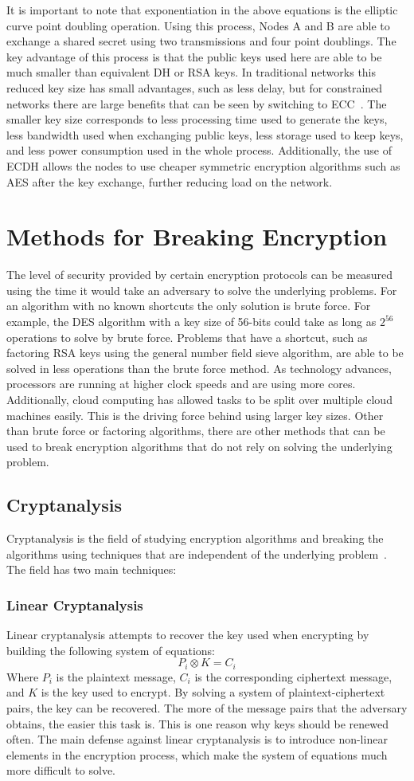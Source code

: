 \documentclass[journal]{IEEEtran}
\begin{document}
It is important to note that exponentiation in the above equations is the elliptic curve point doubling operation. Using this process, Nodes A and B are able to exchange a shared secret using two transmissions and four point doublings. The key advantage of this process is that the public keys used here are able to be much smaller than equivalent DH or RSA keys. In traditional networks this reduced key size has small advantages, such as less delay, but for constrained networks there are large benefits that can be seen by switching to ECC~\cite{ECC2}. The smaller key size corresponds to less processing time used to generate the keys, less bandwidth used when exchanging public keys, less storage used to keep keys, and less power consumption used in the whole process. Additionally, the use of ECDH allows the nodes to use cheaper symmetric encryption algorithms such as AES after the key exchange, further reducing load on the network.

\section{Methods for Breaking Encryption}
The level of security provided by certain encryption protocols can be measured using the time it would take an adversary to solve the underlying problems. For an algorithm with no known shortcuts the only solution is brute force. For example, the DES algorithm with a key size of 56-bits could take as long as $2^{56}$ operations to solve by brute force. Problems that have a shortcut, such as factoring RSA keys using the general number field sieve algorithm, are able to be solved in less operations than the brute force method. As technology advances, processors are running at higher clock speeds and are using more cores. Additionally, cloud computing has allowed tasks to be split over multiple cloud machines easily. This is the driving force behind using larger key sizes. Other than brute force or factoring algorithms, there are other methods that can be used to break encryption algorithms that do not rely on solving the underlying problem.
\subsection{Cryptanalysis}
Cryptanalysis is the field of studying encryption algorithms and breaking the algorithms using techniques that are independent of the underlying problem~\cite{CA1}. The field has two main techniques: 
\subsubsection{Linear Cryptanalysis}
Linear cryptanalysis attempts to recover the key used when encrypting by building the following system of equations:
\[ P_i \otimes K = C_i \]
Where $P_i$ is the plaintext message, $C_i$ is the corresponding ciphertext message, and $K$ is the key used to encrypt. By solving a system of plaintext-ciphertext pairs, the key can be recovered. The more of the message pairs that the adversary obtains, the easier this task is. This is one reason why keys should be renewed often. The main defense against linear cryptanalysis is to introduce non-linear elements in the encryption process, which make the system of equations much more difficult to solve.
\end{document}
